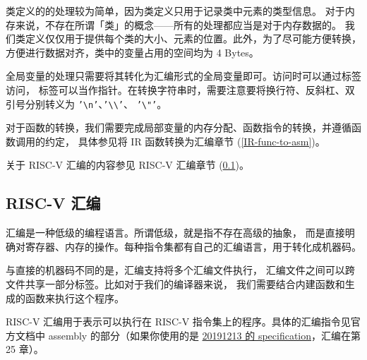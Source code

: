类定义的的处理较为简单，因为类定义只用于记录类中元素的类型信息。
对于内存来说，不存在所谓「类」的概念——所有的处理都应当是对于内存数据的。
我们类定义仅仅用于提供每个类的大小、元素的位置。此外，为了尽可能方便转换，
方便进行数据对齐，类中的变量占用的空间均为 4 Bytes。

全局变量的处理只需要将其转化为汇编形式的全局变量即可。访问时可以通过标签访问，
标签可以当作指针。在转换字符串时，需要注意要将换行符、反斜杠、双引号分别转义为
\texttt{'\textbackslash{}n'}、\texttt{'\textbackslash\textbackslash'}、
\texttt{'\textbackslash"'}。

对于函数的转换，我们需要完成局部变量的内存分配、函数指令的转换，并遵循函数调用的约定，
具体参见将 IR 函数转换为汇编章节 (\ref{IR-func-to-asm})。

关于 RISC-V 汇编的内容参见 RISC-V 汇编章节 (\ref{RV-asm-intro})。

\subsection{RISC-V 汇编}\label{RV-asm-intro}

汇编是一种低级的编程语言。所谓低级，就是指不存在高级的抽象，
而是直接明确对寄存器、内存的操作。每种指令集都有自己的汇编语言，用于转化成机器码。

与直接的机器码不同的是，汇编支持将多个汇编文件执行，
汇编文件之间可以跨文件共享一部分标签。比如对于我们的编译器来说，
我们需要结合内建函数和生成的函数来执行这个程序。

RISC-V 汇编用于表示可以执行在 RISC-V 指令集上的程序。具体的汇编指令见官方文档中
assembly 的部分（如果你使用的是
\href{https://riscv.org/wp-content/uploads/2019/12/riscv-spec-20191213.pdf}{20191213
的 specification}，汇编在第 25 章）。

